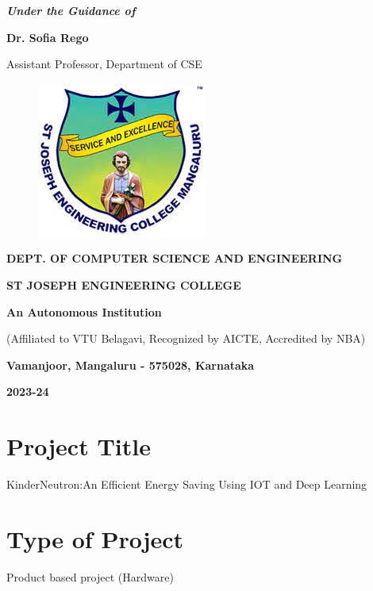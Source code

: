 \documentclass[12pt,a4paper]{report}
\begin{document}
\begin{center}
\vspace{12pt}
\textit{\textbf{Under the Guidance of}}
\par
\vspace{6pt}
\textbf{Dr. Sofia Rego }
\par
\vspace{2pt}
\normalsize { Assistant Professor, Department of CSE }
\par
\begin{figure}[hbtp]
\centering
\includegraphics[scale=0.6]{./pic/sjeclogo}
\end{figure}
\large \textbf{DEPT. OF COMPUTER SCIENCE AND ENGINEERING}
\par \Large \textbf{ST JOSEPH ENGINEERING COLLEGE}
\par 
\textbf{An Autonomous Institution}
\par
{\large{(Affiliated to VTU Belagavi, Recognized by AICTE, Accredited by NBA)}}
\par
\vspace{3pt}
{\large \textbf{Vamanjoor, Mangaluru - 575028, Karnataka}}
\par 
\vspace{12pt}
{\Large \textbf{2023-24}}
\end{center}
\newpage

\pagestyle{plain}

\section*{Project Title}
KinderNeutron:An Efficient Energy Saving Using IOT and Deep Learning 

\section*{Type of Project}
Product based project (Hardware) 
\end{document}
